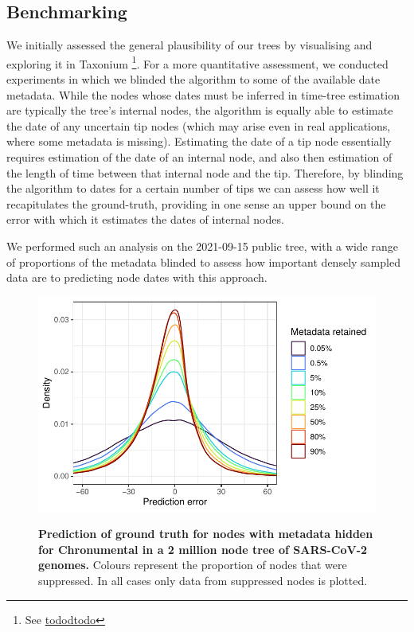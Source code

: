 \subsection*{Benchmarking}

We initially assessed the general plausibility of our trees by visualising and exploring it in Taxonium \cite{taxonium} \footnote{See \url{tododtodo}}. For a more quantitative assessment, we conducted experiments in which we blinded the algorithm to some of the available date metadata. While the nodes whose dates must be inferred in time-tree estimation are typically the tree's internal nodes, the algorithm is equally able to estimate the date of any uncertain tip nodes (which may arise even in real applications, where some metadata is missing). Estimating the date of a tip node essentially requires estimation of the date of an internal node, and also then estimation of the length of time between that internal node and the tip. Therefore, by blinding the algorithm to dates for a certain number of tips we can assess how well it recapitulates the ground-truth, providing in one sense an upper bound on the error with which it estimates the dates of internal nodes.

We performed such an analysis on the 2021-09-15 public tree, with a wide range of proportions of the metadata blinded to assess how important densely sampled data are to predicting node dates with this approach.

\begin{figure}[t!]
\centering
\includegraphics[width=0.7\linewidth]{manuscript/Figures/blinding.pdf}
\label{agreement}
\caption{\textbf{Prediction of ground truth for nodes with metadata hidden for Chronumental in a 2 million node tree of SARS-CoV-2 genomes.}
 Colours represent the proportion of nodes that were suppressed. In all cases only data from suppressed nodes is plotted.}

\end{figure}


